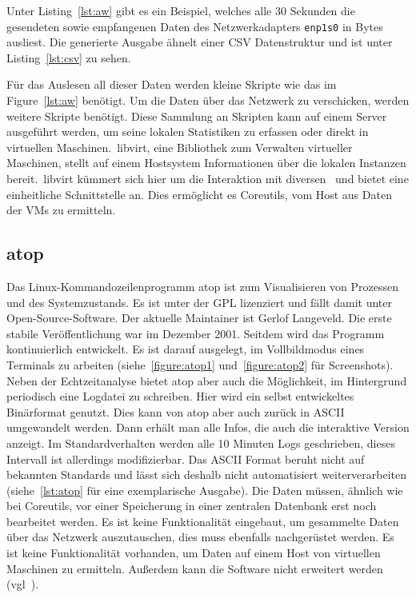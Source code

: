 {Unter Listing~\ref{lst:aw} gibt es ein Beispiel, welches alle 30 Sekunden die
gesendeten sowie empfangenen Daten des Netzwerkadapters \texttt{enp1s0} in
Bytes ausliest. Die generierte Ausgabe ähnelt einer \gls{CSV} Datenstruktur und
ist unter Listing~\ref{lst:csv} zu sehen.

Für das Auslesen all dieser Daten werden kleine Skripte wie das im
Figure~\ref{lst:aw} benötigt. Um die Daten über das Netzwerk zu verschicken,
werden weitere Skripte benötigt. Diese Sammlung an Skripten kann auf einem
Server ausgeführt werden, um seine lokalen Statistiken zu erfassen oder direkt
in virtuellen Maschinen.\ libvirt, eine Bibliothek zum Verwalten virtueller
Maschinen, stellt auf einem Hostsystem Informationen über die lokalen Instanzen
bereit.\ libvirt kümmert sich hier um die Interaktion mit
diversen~ und bietet eine einheitliche
Schnittstelle an. Dies ermöglicht es Coreutils, vom Host aus Daten der VMs zu
ermitteln.
\tm%

\subsection{atop}
Das Linux\hyp{}Kommandozeilenprogramm atop ist zum Visualisieren von Prozessen
und des Systemzustands. Es ist unter der GPL lizenziert und fällt damit unter
Open\hyp{}Source\hyp{}Software. Der aktuelle \gls{Maintainer} ist Gerlof
Langeveld. Die erste stabile Veröffentlichung war im Dezember 2001. Seitdem
wird das Programm kontinuierlich entwickelt. Es ist darauf ausgelegt, im
Vollbildmodus eines Terminals zu arbeiten (siehe~\ref{figure:atop1}
und~\ref{figure:atop2} für Screenshots). Neben der Echtzeitanalyse bietet atop
aber auch die Möglichkeit, im Hintergrund periodisch eine Logdatei zu
schreiben. Hier wird ein selbst entwickeltes Binärformat genutzt. Dies kann von
atop aber auch zurück in ASCII umgewandelt werden. Dann erhält man alle Infos,
die auch die interaktive Version anzeigt. Im Standardverhalten werden alle 10
Minuten Logs geschrieben, dieses Intervall ist allerdings modifizierbar. Das
ASCII Format beruht nicht auf bekannten Standards und lässt sich deshalb nicht
automatisiert weiterverarbeiten (siehe~\ref{lst:atop} für eine exemplarische
Ausgabe). Die Daten müssen, ähnlich wie bei Coreutils, vor einer Speicherung in
einer zentralen Datenbank erst noch bearbeitet werden. Es ist keine
Funktionalität eingebaut, um gesammelte Daten über das Netzwerk auszutauschen,
dies muss ebenfalls nachgerüstet werden. Es ist keine Funktionalität vorhanden,
um Daten auf einem Host von virtuellen Maschinen zu ermitteln. Außerdem kann
die Software nicht erweitert werden (vgl~\cite{atop}).
\tm%

}
